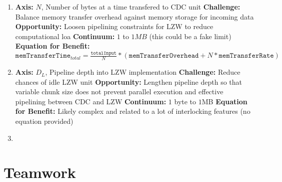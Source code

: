 \documentclass{article}
\begin{document}
\begin{enumerate}
\item%

\textbf{Axis:} $N$, Number of bytes at a time transfered to CDC unit
\newline
\textbf{Challenge:} Balance memory transfer overhead against memory storage for incoming data
\newline
\textbf{Opportunity:} Loosen pipelining constraints for LZW to reduce computational loa
\newline
\textbf{Continuum:} $1$ to $1MB$ (this could be a fake limit)
\newline
\textbf{Equation for Benefit:} $\texttt{memTransferTime}_{total} = \frac{\texttt{totalInput}}{N}*\left(\texttt{memTransferOverhead} + N*\texttt{memTransferRate}    \right)$

\item%

\textbf{Axis:} $D_L$, Pipeline depth into LZW implementation
\newline
\textbf{Challenge:} Reduce chances of idle LZW unit
\newline
\textbf{Opportunity:} Lengthen pipeline depth so that variable chunk size does not prevent parallel execution and effective pipelining between CDC and LZW
\newline
\textbf{Continuum:} $1$ byte to $1$MB
\newline
\textbf{Equation for Benefit:} Likely complex and related to a lot of interlocking features (no equation provided)

\item%

\end{enumerate}


\section{Teamwork}


\begin{appendices}
%
%
%


\end{appendices}
\end{document}
